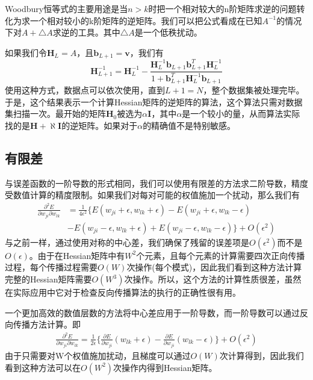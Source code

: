 Woodbury恒等式的主要用途是当$n>k$时把一个相对较大的n阶矩阵求逆的问题转化为求一个相对较小的k阶矩阵的逆矩阵。我们可以把公式看成在已知$A^{-1}$的情况下对$A+\triangle A$求逆的工具。其中$\triangle A$是一个低秩扰动。

如果我们令$\boldsymbol{H}_L=A$，且$\boldsymbol{b}_{L+1}=\boldsymbol{v}$，我们有
\begin{equation}
	\boldsymbol{H}_{L+1}^{-1}=\boldsymbol{H}_{L}^{-1}-\frac{\boldsymbol{H}_{L}^{-1}\boldsymbol{b}_{L+1}\boldsymbol{b}_{L+1}^T\boldsymbol{H}_L^{-1} }{1+\boldsymbol{b}_{L+1}^T\boldsymbol{H}_L^{-1}\boldsymbol{b}_{L+1} }
\end{equation}
使用这种方式，数据点可以依次使用，直到$L+1=N$，整个数据集被处理完毕。于是，这个结果表示一个计算Hessian矩阵的逆矩阵的算法，这个算法只需对数据集扫描一次。最开始的矩阵$\boldsymbol{H}_0$被选为$\alpha \boldsymbol{I}$，其中$\alpha$是一个较小的量，从而算法实际找的是$\boldsymbol{H}+\aleph \boldsymbol{I}$的逆矩阵。如果对于$\alpha$的精确值不是特别敏感。
\subsection*{有限差}
与误差函数的一阶导数的形式相同，我们可以使用有限差的方法求二阶导数，精度受数值计算的精度限制。如果我们对每对可能的权值施加一个扰动，那么我们有
\begin{equation}
	\begin{aligned}
		\frac{\partial^2 E}{\partial w_{ji}\partial w_{lk}}&=\frac{1}{4\epsilon^2}\{E(w_{ji}+\epsilon,w_{lk}+\epsilon)-E(w_{ji}+\epsilon,w_{lk}-\epsilon)\\
		&-E(w_{ji}-\epsilon,w_{lk}+\epsilon)+E(w_{ji}-\epsilon,w_{lk}-\epsilon) \}+O(\epsilon^2)
	\end{aligned}
\end{equation}
与之前一样，通过使用对称的中心差，我们确保了残留的误差项是$O(\epsilon^2)$而不是$O(\epsilon)$。由于在Hessian矩阵中有$W^2$个元素，且每个元素的计算需要四次正向传播过程，每个传播过程需要$O(W)$次操作(每个模式)，因此我们看到这种方法计算完整的Hessian矩阵需要$O(W^3)$次操作。所以，这个方法的计算性质很差，虽然在实际应用中它对于检查反向传播算法的执行的正确性很有用。

一个更加高效的数值层数的方法将中心差应用于一阶导数，而一阶导数可以通过反向传播方法计算。即
\begin{equation}
\begin{aligned}
	\frac{\partial^2 E}{\partial w_{ji}\partial w_{lk}}=\frac{1}{2\epsilon}\{\frac{\partial E}{\partial w_{ji}}(w_{lk}+\epsilon)-\frac{\partial E}{\partial w_{ji}}(w_{lk}-\epsilon) \}+O(\epsilon^2)
\end{aligned}
\end{equation}
由于只需要对W个权值施加扰动，且梯度可以通过$O(W)$次计算得到，因此我们看到这种方法可以在$O(W^2)$次操作内得到Hessian矩阵。
